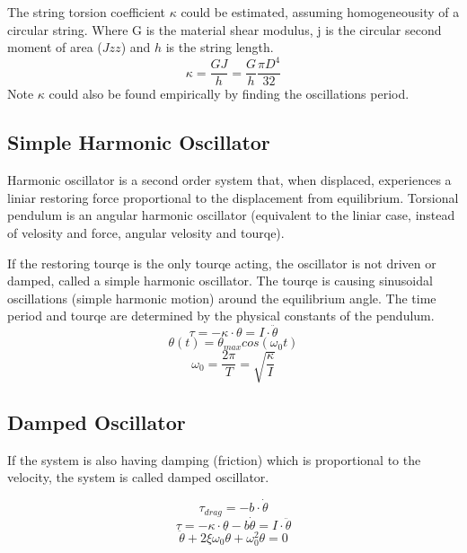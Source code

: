 \documentclass[\main/master.tex]{subfiles}
\begin{document}
The string torsion coefficient $\kappa $ could be estimated, assuming homogeneousity of a circular string. Where G is the material shear modulus, j is the circular second moment of area ($Jzz$) and $h$ is the string length.
\begin{equation}
\kappa = \frac{GJ}{h} = \frac{G}{h} \frac{\pi D^4}{32}    \label{eqn:torsion_coefficient}
\end{equation}
Note  $\kappa$ could also be found empirically by finding  the  oscillations period.
 


\subsection{Simple Harmonic Oscillator}
Harmonic oscillator is a second order system that, when displaced, experiences a liniar restoring force proportional to the displacement from equilibrium. Torsional pendulum is an angular harmonic oscillator (equivalent to the liniar case, instead of velosity and force, angular velosity and tourqe).
\par

If the restoring tourqe is the only tourqe acting, the oscillator is not driven or damped, called a simple harmonic oscillator. The tourqe is causing sinusoidal oscillations (simple harmonic motion) around the equilibrium angle. The time period and tourqe are determined by the physical constants of the pendulum. 
\begin{equation}
\tau = -\kappa\cdot\theta  = I\cdot\ddot{\theta}   \label{eqn:undamped_motion_equation}
\end{equation}
\begin{equation}
\theta(t) = \theta_{max}cos(\omega_0 t )    \label{eqn:undamped_motion_equation}
\end{equation}
\begin{equation}
\omega_0  = \frac{2\pi}{T} = \sqrt{\frac{\kappa}{I}}   \label{eqn:undamped_motion_equation}
\end{equation}

\subsection{Damped Oscillator}
If the system is also having damping (friction) which is proportional to the velocity, the system is called damped oscillator.


\begin{equation}
\tau_{drag} = -b\cdot\dot{\theta}   \label{eqn:friction_tourqe}
\end{equation} 
\begin{equation}
\tau = -\kappa\cdot\theta - b\dot{\theta}  = I\cdot\ddot{\theta}   \label{eqn:damped_motion_equation}
\end{equation} 
\begin{equation}
\ddot{\theta} + 2\xi\omega_0\dot{\theta} + \omega_0^2\theta = 0   \label{eqn:damped_motion_equation}
\end{equation}
\end{document}
